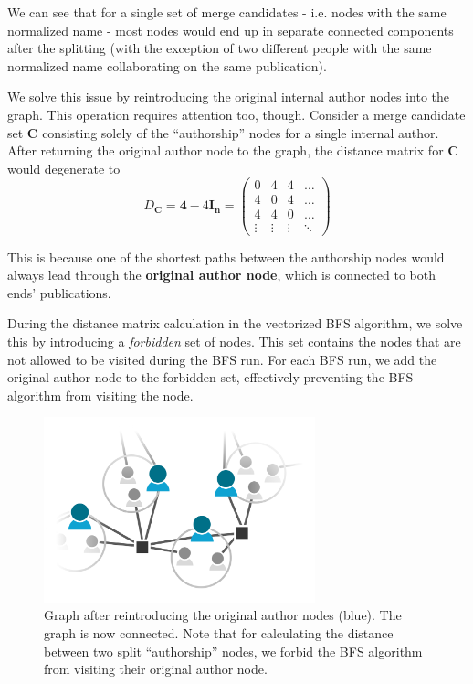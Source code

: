 We can see that for a single set of merge candidates - i.e. nodes with the same normalized name - 
most nodes would end up in separate connected components after the splitting (with the exception of two different people with the same normalized name collaborating on the same publication).

We solve this issue by reintroducing the original internal author nodes into the graph.
This operation requires attention too, though. 
Consider a merge candidate set $\mathbf{C}$ consisting solely of the ``authorship'' nodes for a single internal author.
After returning the original author node to the graph, the distance matrix for $\mathbf{C}$ would degenerate to
$$
D_{\mathbf{C}} = \mathbf{4} - 4\mathbf{I_n} = \left( \begin{array}{cccc}
0 & 4 & 4 & \hdots \\
4 & 0 & 4 & \hdots \\
4 & 4 & 0 & \hdots \\
\vdots & \vdots & \vdots & \ddots
\end{array} \right)
$$

This is because one of the shortest paths between the authorship nodes would always lead through the \textbf{original author node},
which is connected to both ends' publications.

During the distance matrix calculation in the vectorized BFS algorithm, we solve this by introducing a \textit{forbidden}
set of nodes. This set contains the nodes that are not allowed to be visited during the BFS run.
For each BFS run, we add the original author node to the forbidden set, effectively preventing the BFS algorithm from visiting the node.

\begin{figure}[ht!]
    \captionsetup{width=.9\linewidth}
    \includegraphics[width=0.7\textwidth]{../img/merging-splitting-reintroduced.png}
    \centering
    \caption{Graph after reintroducing the original author nodes (blue). The graph is now connected. Note that for calculating the distance between two split ``authorship'' nodes, we forbid the BFS algorithm from visiting their original author node.}
\end{figure}

